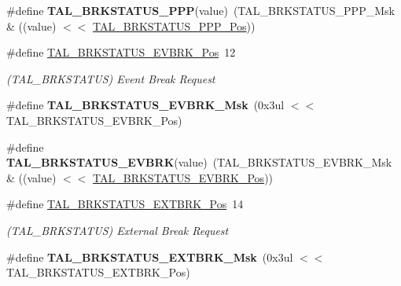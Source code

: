 \begin{DoxyCompactItemize}
\item 
\hypertarget{group___s_a_m_l21___t_a_l_ga7dcf2c784978f0c9aa0aee82a3c9ed24}{}\#define {\bfseries T\+A\+L\+\_\+\+B\+R\+K\+S\+T\+A\+T\+U\+S\+\_\+\+P\+P\+P}(value)~(T\+A\+L\+\_\+\+B\+R\+K\+S\+T\+A\+T\+U\+S\+\_\+\+P\+P\+P\+\_\+\+Msk \& ((value) $<$$<$ \hyperlink{group___s_a_m_l21___t_a_l_ga621478431fba0c6cb259c35994bcd674}{T\+A\+L\+\_\+\+B\+R\+K\+S\+T\+A\+T\+U\+S\+\_\+\+P\+P\+P\+\_\+\+Pos}))\label{group___s_a_m_l21___t_a_l_ga7dcf2c784978f0c9aa0aee82a3c9ed24}

\item 
\hypertarget{group___s_a_m_l21___t_a_l_gac0c3ae7722c3c5b9cfdb7fc1d7401a10}{}\#define \hyperlink{group___s_a_m_l21___t_a_l_gac0c3ae7722c3c5b9cfdb7fc1d7401a10}{T\+A\+L\+\_\+\+B\+R\+K\+S\+T\+A\+T\+U\+S\+\_\+\+E\+V\+B\+R\+K\+\_\+\+Pos}~12\label{group___s_a_m_l21___t_a_l_gac0c3ae7722c3c5b9cfdb7fc1d7401a10}

\begin{DoxyCompactList}\small\item\em (T\+A\+L\+\_\+\+B\+R\+K\+S\+T\+A\+T\+U\+S) Event Break Request \end{DoxyCompactList}\item 
\hypertarget{group___s_a_m_l21___t_a_l_gaf28444e22fa4fb90b25e5db4fa1ce0f9}{}\#define {\bfseries T\+A\+L\+\_\+\+B\+R\+K\+S\+T\+A\+T\+U\+S\+\_\+\+E\+V\+B\+R\+K\+\_\+\+Msk}~(0x3ul $<$$<$ T\+A\+L\+\_\+\+B\+R\+K\+S\+T\+A\+T\+U\+S\+\_\+\+E\+V\+B\+R\+K\+\_\+\+Pos)\label{group___s_a_m_l21___t_a_l_gaf28444e22fa4fb90b25e5db4fa1ce0f9}

\item 
\hypertarget{group___s_a_m_l21___t_a_l_gaf4c10a84fea582a9c957d0b96e52ba75}{}\#define {\bfseries T\+A\+L\+\_\+\+B\+R\+K\+S\+T\+A\+T\+U\+S\+\_\+\+E\+V\+B\+R\+K}(value)~(T\+A\+L\+\_\+\+B\+R\+K\+S\+T\+A\+T\+U\+S\+\_\+\+E\+V\+B\+R\+K\+\_\+\+Msk \& ((value) $<$$<$ \hyperlink{group___s_a_m_l21___t_a_l_gac0c3ae7722c3c5b9cfdb7fc1d7401a10}{T\+A\+L\+\_\+\+B\+R\+K\+S\+T\+A\+T\+U\+S\+\_\+\+E\+V\+B\+R\+K\+\_\+\+Pos}))\label{group___s_a_m_l21___t_a_l_gaf4c10a84fea582a9c957d0b96e52ba75}

\item 
\hypertarget{group___s_a_m_l21___t_a_l_ga9949164282f874454e8315d0c49bfcc0}{}\#define \hyperlink{group___s_a_m_l21___t_a_l_ga9949164282f874454e8315d0c49bfcc0}{T\+A\+L\+\_\+\+B\+R\+K\+S\+T\+A\+T\+U\+S\+\_\+\+E\+X\+T\+B\+R\+K\+\_\+\+Pos}~14\label{group___s_a_m_l21___t_a_l_ga9949164282f874454e8315d0c49bfcc0}

\begin{DoxyCompactList}\small\item\em (T\+A\+L\+\_\+\+B\+R\+K\+S\+T\+A\+T\+U\+S) External Break Request \end{DoxyCompactList}\item 
\hypertarget{group___s_a_m_l21___t_a_l_ga505425648581cec6a8bd4a48d58535c1}{}\#define {\bfseries T\+A\+L\+\_\+\+B\+R\+K\+S\+T\+A\+T\+U\+S\+\_\+\+E\+X\+T\+B\+R\+K\+\_\+\+Msk}~(0x3ul $<$$<$ T\+A\+L\+\_\+\+B\+R\+K\+S\+T\+A\+T\+U\+S\+\_\+\+E\+X\+T\+B\+R\+K\+\_\+\+Pos)\label{group___s_a_m_l21___t_a_l_ga505425648581cec6a8bd4a48d58535c1}


\end{DoxyCompactItemize}
